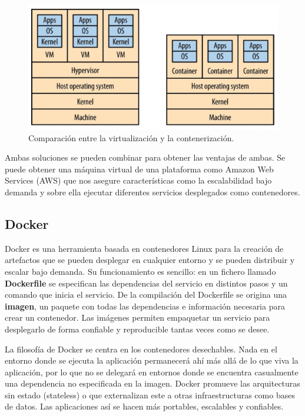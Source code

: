 \documentclass[11pt,spanish,listoffigures,listoftables]{tfgetsinf}
\begin{document}
\begin{figure}[h]
\centering
\includegraphics[scale=0.8]{containers_vms}
\caption{Comparación entre la virtualización y la contenerización. \cite{Newman2015a}}
\end{figure}

Ambas soluciones se pueden combinar para obtener las ventajas de ambas. Se puede obtener una máquina virtual de una plataforma como Amazon Web Services (AWS) que nos asegure características como la escalabilidad bajo demanda y sobre ella ejecutar diferentes servicios desplegados como contenedores.

\subsection{Docker}

Docker es una herramienta basada en contenedores Linux para la creación de artefactos que se pueden desplegar en cualquier entorno y se pueden distribuir y escalar bajo demanda. \cite{Matthias} Su funcionamiento es sencillo: en un fichero llamado \textbf{Dockerfile} se especifican las dependencias del servicio en distintos pasos y un comando que inicia el servicio. De la compilación del Dockerfile se origina una \textbf{imagen}, un paquete con todas las dependencias e información necesaria para crear un contenedor. Las imágenes permiten empaquetar un servicio para desplegarlo de forma confiable y reproducible tantas veces como se desee. \cite{DelaTorre2018}

La filosofía de Docker se centra en los contenedores desechables. Nada en el entorno donde se ejecuta la aplicación permanecerá ahí más allá de lo que viva la aplicación, por lo que no se delegará en entornos donde se encuentra casualmente una dependencia no especificada en la imagen. Docker promueve las arquitecturas sin estado (stateless) o que externalizan este a otras infraestructuras como bases de datos. Las aplicaciones así se hacen más portables, escalables y confiables. \cite{Matthias}
\end{document}
